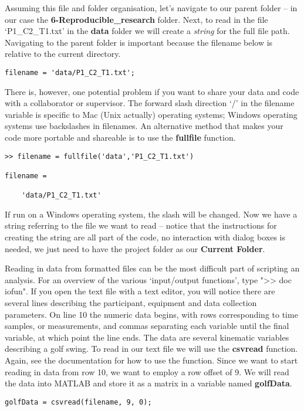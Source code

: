 \documentclass[12pt,a4paper]{article}
\begin{document}
Assuming this file and folder organisation, let's navigate to our parent folder – in our case the \textbf{6-Reproducible\_research} folder. 
Next, to read in the file `P1\_C2\_T1.txt' in the \textbf{data} folder we will create a \emph{string} for the full file path.
Navigating to the parent folder is important because the filename below is relative to the current directory.
\begin{lstlisting}[style=Matlab-editor]
filename = 'data/P1_C2_T1.txt';
\end{lstlisting}

There is, however, one potential problem if you want to share your data and code with a collaborator or supervisor.
The forward slash direction `/' in the filename variable is specific to Mac (Unix actually) operating systems; Windows operating systems use backslashes in filenames.
An alternative method that makes your code more portable and shareable is to use the \textbf{fullfile} function.
\begin{lstlisting}[style=Matlab-editor]
>> filename = fullfile('data','P1_C2_T1.txt')

filename =

    'data/P1_C2_T1.txt'

\end{lstlisting}

If run on a Windows operating system, the slash will be changed.
Now we have a string referring to the file we want to read -- notice that the instructions for creating the string are all part of the code, no interaction with dialog boxes is needed, we just need to have the project folder as our \textbf{Current Folder}.

Reading in data from formatted files can be the most difficult part of scripting an analysis.
For an overview of the various `input/output functions', type ">> doc iofun".
If you open the text file with a text editor, you will notice there are several lines describing the participant, equipment and data collection parameters.
On line 10 the numeric data begins, with rows corresponding to time samples, or measurements, and commas separating each variable until the final variable, at which point the line ends.
The data are several kinematic variables describing a golf swing.
To read in our text file we will use the \textbf{csvread} function.
Again, see the documentation for how to use the function.
Since we want to start reading in data from row 10, we want to employ a row offset of 9.
We will read the data into MATLAB and store it as a matrix in a variable named \textbf{golfData}.
\begin{lstlisting}[style=Matlab-editor]
golfData = csvread(filename, 9, 0);
\end{lstlisting}
\end{document}
